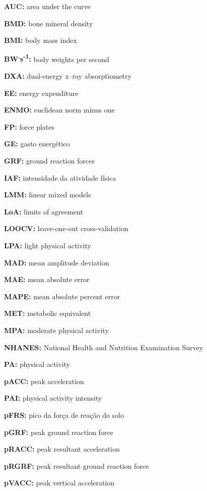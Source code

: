 \documentclass[12pt]{article}
\begin{document}
\noindent \textbf{AUC:} area under the curve

\noindent \textbf{BMD:} bone mineral density

\noindent \textbf{BMI:} body mass index

\noindent \textbf{BW\textsuperscript{.}s\textsuperscript{-1}:} body weights per second

\noindent \textbf{DXA:} dual-energy x–ray absorptiometry

\noindent \textbf{EE:} energy expenditure

\noindent \textbf{ENMO:} euclidean norm minus one

\noindent \textbf{FP:} force plates

\noindent \textbf{GE:} gasto energético

\noindent \textbf{GRF:} ground reaction forces

\noindent \textbf{IAF:} intensidade da atividade física

\noindent \textbf{LMM:} linear mixed models

\noindent \textbf{LoA:} limits of agreement

\noindent \textbf{LOOCV:} leave-one-out cross-validation

\noindent \textbf{LPA:} light physical activity

\noindent \textbf{MAD:} mean amplitude deviation

\noindent \textbf{MAE:} mean absolute error

\noindent \textbf{MAPE:} mean absolute percent error

\noindent \textbf{MET:} metabolic equivalent

\noindent \textbf{MPA:} moderate physical activity

\noindent \textbf{NHANES:} National Health and Nutrition Examination Survey

\noindent \textbf{PA:} physical activity

\noindent \textbf{pACC:} peak acceleration

\noindent \textbf{PAI:} physical activity intensity

\noindent \textbf{pFRS:} pico da força de reação do solo

\noindent \textbf{pGRF:} peak ground reaction force

\noindent \textbf{pRACC:} peak resultant acceleration

\noindent \textbf{pRGRF:} peak resultant ground reaction force

\noindent \textbf{pVACC:} peak vertical acceleration
\end{document}
